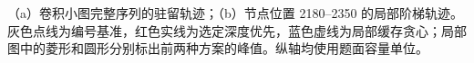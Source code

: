 （a）卷积小图完整序列的驻留轨迹；（b）节点位置 2180–2350 的局部阶梯轨迹。灰色点线为编号基准，红色实线为选定深度优先，蓝色虚线为局部缓存贪心；局部图中的菱形和圆形分别标出前两种方案的峰值。纵轴均使用题面容量单位。
